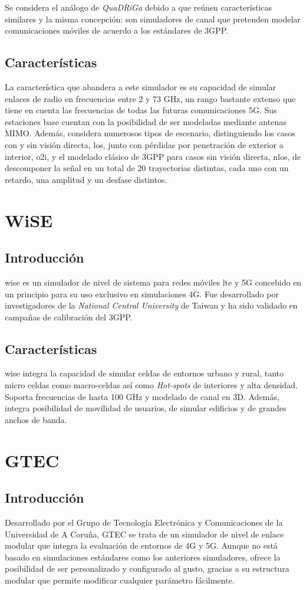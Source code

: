 Se considera el análogo de \textit{QuaDRiGa} debido a que reúnen características similares y la misma concepción: son simuladores de canal que pretenden modelar comunicaciones móviles de acuerdo a los estándares de 3GPP.
\subsection{Características}
La característica que abandera a este simulador es su capacidad de simular enlaces de radio en frecuencias entre 2 y 73 GHz, un rango bastante extenso que tiene en cuenta las frecuencias de todas las futuras comunicaciones 5G. Sus estaciones base cuentan con la posibilidad de ser modeladas mediante antenas MIMO. Además, considera numerosos tipos de escenario, distinguiendo los casos con y sin visión directa, \ac{los}, junto con pérdidas por penetración de exterior a interior, \ac{o2i}, y el modelado clásico de 3GPP para casos sin visión directa, \ac{nlos}, de descomponer la señal en un total de 20 trayectorias distintas, cada uno con un retardo, una amplitud y un desfase distintos.

\section{WiSE}
\subsection{Introducción}
\ac{wise} \cite{wise} es un simulador de nivel de sistema para redes móviles \acs{lte} y 5G concebido en un principio para su uso exclusivo en simulaciones 4G. Fue desarrollado por investigadores de la \textit{National Central University} de Taiwan y ha sido validado en campañas de calibración del 3GPP.
\subsection{Características}
\acs{wise} integra la capacidad de simular celdas de entornos urbano y rural, tanto micro celdas como macro-celdas así como \textit{Hot-spots} de interiores y alta densidad. Soporta frecuencias de hasta 100 GHz y modelado de canal en 3D. Además, integra posibilidad de movilidad de usuarios, de simular edificios y de grandes anchos de banda.

\section{GTEC}
\subsection{Introducción}
Desarrollado por el Grupo de Tecnología Electrónica y Comunicaciones de la Universidad de A Coruña, GTEC \cite{gtec} se trata de un simulador de nivel de enlace modular que integra la evaluación de entornos de 4G y 5G. Aunque no está basado en simulaciones estándares como los anteriores simuladores, ofrece la posibilidad de ser personalizado y configurado al gusto, gracias a su estructura modular que permite modificar cualquier parámetro fácilmente.

